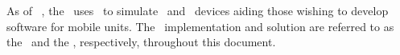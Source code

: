 As of \dvttermandroid\ , the \dvttermandroidemulator\ uses \dvttermqemu\ to simulate \dvttermarm\ and \dvttermxeightysix\ devices aiding those wishing to develop software for mobile units.
The \dvttermandroidemulator\ implementation and solution are referred to as the \dvttermreferenceimplementation\ and the \dvttermreferencesolution , respectively, throughout this document.


